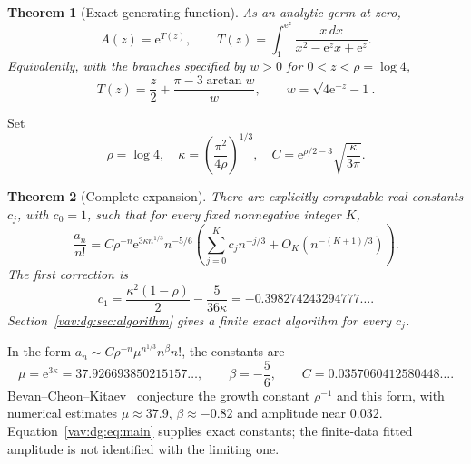 \documentclass[11pt]{article}
\newtheorem{theorem}{Theorem}[section]
\theoremstyle{remark}\newtheorem{remark}[theorem]{Remark}
\newcommand{\ee}{\mathrm e}
\begin{document}
\begin{theorem}[Exact generating function]\label{vav:dg:thm:egf}
As an analytic germ at zero,
\begin{equation}\label{vav:dg:eq:exact}
 A(z)=\ee^{T(z)},\qquad
 T(z)=\int_1^{\ee^z}\frac{x\,dx}{x^2-\ee^zx+\ee^z}.
\end{equation}
Equivalently, with the branches specified by $w>0$ for
$0<z<\rho=\log4$,
\begin{equation}\label{vav:dg:eq:atan}
 T(z)=\frac z2+\frac{\pi-3\arctan w}{w},
 \qquad w=\sqrt{4\ee^{-z}-1}.
\end{equation}
\end{theorem}

Set
\begin{equation}\label{vav:dg:eq:constants}
 \rho=\log4,\quad
 \kappa=\left(\frac{\pi^2}{4\rho}\right)^{1/3},\quad
 C=\ee^{\rho/2-3}\sqrt{\frac{\kappa}{3\pi}}.
\end{equation}

\begin{theorem}[Complete expansion]\label{vav:dg:thm:asym}
There are explicitly computable real constants $c_j$, with $c_0=1$, such
that for every fixed nonnegative integer $K$,
\begin{equation}\label{vav:dg:eq:main}
 \frac{a_n}{n!}
 =C\rho^{-n}\ee^{3\kappa n^{1/3}}n^{-5/6}
 \left(\sum_{j=0}^{K}c_jn^{-j/3}
              +O_K(n^{-(K+1)/3})\right).
\end{equation}
The first correction is
\begin{equation}\label{vav:dg:eq:c1}
 c_1=\frac{\kappa^2(1-\rho)}2-\frac5{36\kappa}
       =-0.398274243294777\ldots .
\end{equation}
Section~\ref{vav:dg:sec:algorithm} gives a finite exact algorithm for every $c_j$.
\end{theorem}

In the form $a_n\sim C\rho^{-n}\mu^{n^{1/3}}n^\beta n!$, the constants are
\[
 \mu=\ee^{3\kappa}=37.926693850215157\ldots,\qquad
 \beta=-\frac56,\qquad C=0.0357060412580448\ldots .
\]
Bevan--Cheon--Kitaev~\cite[Conjectures 13--14]{bck} conjecture the growth
constant $\rho^{-1}$ and this form, with numerical estimates
$\mu\approx37.9$, $\beta\approx-0.82$ and amplitude near $0.032$.
Equation~\eqref{vav:dg:eq:main} supplies exact constants; the finite-data fitted
amplitude is not identified with the limiting one.
\end{document}
